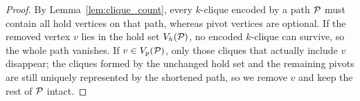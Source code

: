 \begin{proof}
By Lemma~\ref{lem:clique_count}, every $k$-clique encoded by a path
$\TPath{}$ must contain all hold vertices on that path, whereas pivot
vertices are optional. If the removed vertex $v$ lies in the hold set
$V_h(\TPath{})$, no encoded $k$-clique can survive, so the whole path
vanishes. If $v\in V_p(\TPath{})$, only those cliques that actually
include $v$ disappear; the cliques formed by the unchanged hold set and
the remaining pivots are still uniquely represented by the shortened
path, so we remove $v$ and keep the rest of $\TPath{}$ intact.
\end{proof}


% 
\small



